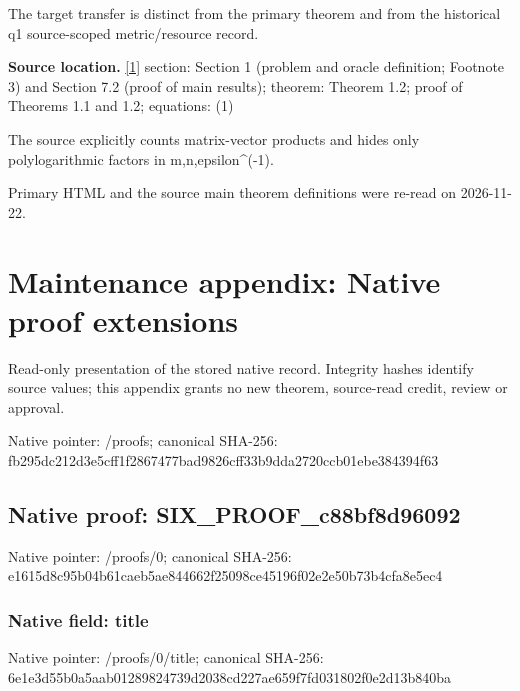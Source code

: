 \documentclass[10pt,a4paper]{article}
\begin{document}
The target transfer is distinct from the primary theorem and from the historical q1 source-scoped metric/resource record.



\textbf{Source location.} \href{https://arxiv.org/pdf/2601.02347v3}{[1]} section: Section 1 (problem and oracle definition; Footnote 3) and Section 7.2 (proof of main results); theorem: Theorem 1.2; proof of Theorems 1.1 and 1.2; equations: (1)



The source explicitly counts matrix-vector products and hides only polylogarithmic factors in m,n,epsilon\textasciicircum{}(-1).



Primary HTML and the source main theorem definitions were re-read on 2026-11-22.



\section{Maintenance appendix: Native proof extensions}


Read-only presentation of the stored native record. Integrity hashes identify source values; this appendix grants no new theorem, source-read credit, review or approval.



Native pointer: /proofs; canonical SHA-256: fb295dc212d3e5cff1f28674\allowbreak{}77bad9826cff33b9dda2720c\allowbreak{}cb01ebe384394f63



\subsection{Native proof: SIX\_PROOF\_c88bf8d96092}


Native pointer: /proofs/0; canonical SHA-256: e1615d8c95b04b61caeb5ae8\allowbreak{}44662f25098ce45196f02e2e\allowbreak{}50b73b4cfa8e5ec4



\subsubsection{Native field: title}


Native pointer: /proofs/0/title; canonical SHA-256: 6e1e3d55b0a5aab012898247\allowbreak{}39d2038cd227ae659f7fd031\allowbreak{}802f0e2d13b840ba
\end{document}
